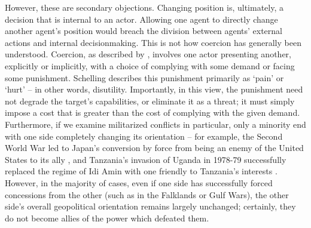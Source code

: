 However, these are secondary objections. Changing position is, ultimately, a decision that is internal to an actor. Allowing one agent to directly change another agent's position would breach the division between agents' external actions and internal decisionmaking. This is not how coercion has generally been understood. Coercion, as described by \citet{schelling_1966}, involves one actor presenting another, explicitly or implicitly, with a choice of complying with some demand or facing some punishment. Schelling describes this punishment primarily as  `pain' or `hurt' -- in other words, disutility. Importantly, in this view, the punishment need not degrade the target's capabilities, or eliminate it as a threat; it must simply impose a cost that is greater than the cost of complying with the given demand. Furthermore, if we examine militarized conflicts in particular, only a minority end with one side completely changing its orientation -- for example, the Second World War led to Japan's conversion by force from being an enemy of the United States to its ally \citep{schaller_1997}, and Tanzania's invasion of Uganda in 1978-79 successfully replaced the regime of Idi Amin with one friendly to Tanzania's interests \citep{acheson_2001}. However, in the majority of cases, even if one side has successfully forced concessions from the other (such as in the Falklands or Gulf Wars), the other side's overall geopolitical orientation remains largely unchanged; certainly, they do not become allies of the power which defeated them.

